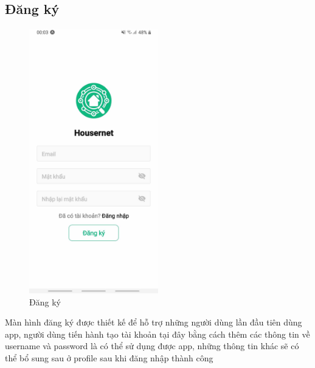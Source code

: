 \subsection{Đăng ký}
\begin{figure}[H]
    \centering
    \includegraphics[width=0.5\textwidth]{Images/app_image/app_5.jpg}
    \caption{Đăng ký}
\end{figure}
Màn hình đăng ký được thiết kế để hỗ trợ những người dùng lần đầu tiên dùng app, người dùng tiến hành tạo tài khoản tại đây bằng cách thêm các thông tin về username và password là có thể sử dụng được app, những thông tin khác sẽ có thể bổ sung sau ở profile sau khi đăng nhập thành công
